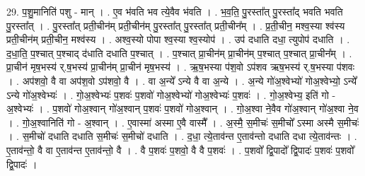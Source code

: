\documentclass[17pt]{extarticle}
\begin{document}
29. प॒शु॒मानिति॑ पशु - मान् । . ए॒व भ॑वति भव त्ये॒वैव भ॑वति । . भ॒व॒ति॒ पु॒रस्ता᳚त् पु॒रस्ता᳚द् भवति भवति पु॒रस्ता᳚त् । . पु॒रस्ता᳚त् प्रती॒चीन॑म् प्रती॒चीन॑म् पु॒रस्ता᳚त् पु॒रस्ता᳚त् प्रती॒चीन᳚म् । . प्र॒ती॒चीन॒ मश्व॒स्या श्व॑स्य प्रती॒चीन॑म् प्रती॒चीन॒ मश्व॑स्य । . अश्व॒स्यो पोपा श्व॒स्या श्व॒स्योप॑ । . उप॑ दधाति दधा॒ त्युपोप॑ दधाति । . द॒धा॒ति॒ प॒श्चात् प॒श्चाद् द॑धाति दधाति प॒श्चात् । . प॒श्चात् प्रा॒चीन॑म् प्रा॒चीन॑म् प॒श्चात् प॒श्चात् प्रा॒चीन᳚म् । . प्रा॒चीन॑ मृष॒भस्य॑ र्.ष॒भस्य॑ प्रा॒चीन॑म् प्रा॒चीन॑ मृष॒भस्य॑ । . ऋ॒ष॒भस्या प॑श॒वो ऽप॑शव ऋष॒भस्य॑ र्.ष॒भस्या प॑शवः । . अप॑शवो॒ वै वा अप॑श॒वो ऽप॑शवो॒ वै । . वा अ॒न्ये᳚ ऽन्ये वै वा अ॒न्ये । . अ॒न्ये गो॑अ॒श्वेभ्यो॑ गोअ॒श्वेभ्यो॒ ऽन्ये᳚ ऽन्ये गो॑अ॒श्वेभ्यः॑ । . गो॒अ॒श्वेभ्यः॑ प॒शवः॑ प॒शवो॑ गोअ॒श्वेभ्यो॑ गोअ॒श्वेभ्यः॑ प॒शवः॑ । . गो॒अ॒श्वेभ्य॒ इति॑ गो - अ॒श्वेभ्यः॑ । . प॒शवो॑ गोअ॒श्वान् गो॑अ॒श्वान् प॒शवः॑ प॒शवो॑ गोअ॒श्वान् । . गो॒अ॒श्वा ने॒वैव गो॑अ॒श्वान् गो॑अ॒श्वा ने॒व । . गो॒अ॒श्वानिति॑ गो - अ॒श्वान् । . ए॒वास्मा॑ अस्मा ए॒वै वास्मै᳚ । . अ॒स्मै॒ स॒मीचः॑ स॒मीचो᳚ ऽस्मा अस्मै स॒मीचः॑ । . स॒मीचो॑ दधाति दधाति स॒मीचः॑ स॒मीचो॑ दधाति । . द॒धा॒ त्ये॒ताव॑न्त ए॒ताव॑न्तो दधाति दधा त्ये॒ताव॑न्तः । . ए॒ताव॑न्तो॒ वै वा ए॒ताव॑न्त ए॒ताव॑न्तो॒ वै । . वै प॒शवः॑ प॒शवो॒ वै वै प॒शवः॑ । . प॒शवो᳚ द्वि॒पादो᳚ द्वि॒पादः॑ प॒शवः॑ प॒शवो᳚ द्वि॒पादः॑ । \newline
\end{document}
